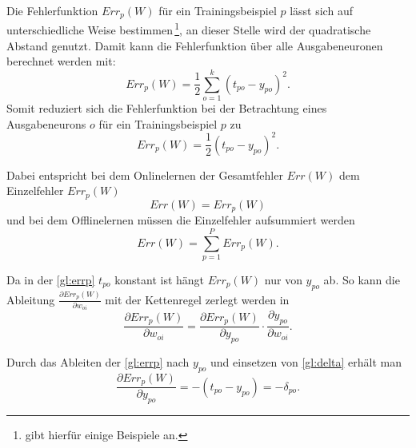 Die Fehlerfunktion $Err_p(W)$ für ein Trainingsbeispiel $p$ lässt sich auf unterschiedliche Weise bestimmen\,\footnote{\citet[60 f]{dkriesel07} gibt hierfür einige Beispiele an.}, an dieser Stelle wird der quadratische Abstand genutzt. Damit kann die Fehlerfunktion über alle Ausgabeneuronen berechnet werden mit:
\begin{equation}
Err_p(W)= \frac{1}{2} \sum^k_{o=1} (t_{po}-y_{po})^2 .
\end{equation}
Somit reduziert sich die Fehlerfunktion bei der Betrachtung eines Ausgabeneurons $o$ für ein Trainingsbeispiel $p$ zu
\begin{equation}
Err_p(W)= \frac{1}{2} (t_{po}-y_{po})^2 .
\label{gl:errp}
\end{equation}


Dabei entspricht bei dem Onlinelernen der Gesamtfehler $Err(W)$ dem Einzelfehler $Err_p(W)$
\begin{equation}
Err(W)=Err_p(W) 
\end{equation}
und bei dem Offlinelernen müssen die Einzelfehler aufsummiert werden
\begin{equation}
Err(W)= \sum^P_{p=1} Err_p(W). 
\end{equation}

Da in der \autoref{gl:errp} $t_{po}$ konstant ist hängt $Err_p(W)$ nur von $y_{po}$ ab. So kann die Ableitung $\frac{\partial Err_p(W)}{\partial w_{oi}}$ mit der Kettenregel zerlegt werden in
\begin{equation}
\frac{\partial Err_p(W)}{\partial w_{oi}}= \frac{\partial Err_p(W)}{\partial y_{po}} \cdot \frac{\partial y_{po}}{\partial w_{oi}}.
\label{gl:zerlket}
\end{equation}

Durch das Ableiten der \autoref{gl:errp} nach $y_{po}$ und einsetzen von \autoref{gl:delta} erhält man
\begin{equation}
\frac{\partial Err_p(W)}{\partial y_{po}} = -(t_{po}-y_{po}) = - \delta_{po} .
\label{gl:minusdelta}
\end{equation}

